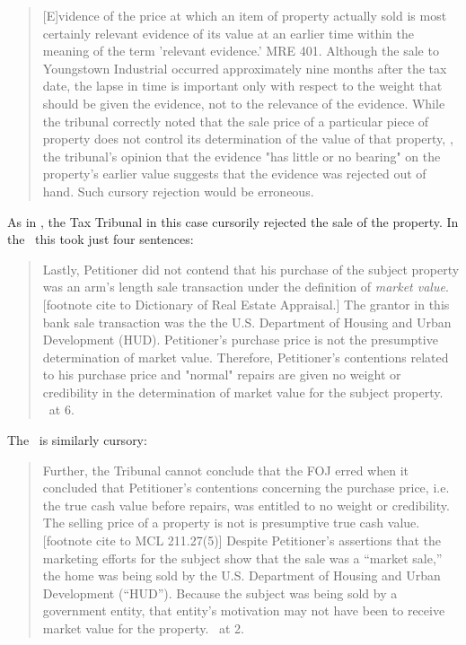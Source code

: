 \documentclass[12pt,\documentclassflag]{michiganCourtOfAppealsBrief}
\begin{document}
\begin{quote}
[E]vidence of the price at which an item of property actually sold is most certainly relevant evidence of its value at an earlier time within the meaning of the term 'relevant evidence.' MRE 401. Although the sale to Youngstown Industrial occurred approximately nine months after the tax date, the lapse in time is important only with respect to the weight that should be given the evidence, not to the relevance of the evidence. While the tribunal correctly noted that the sale price of a particular piece of property does not control its determination of the value of that property, , the tribunal's opinion that the evidence "has little or no bearing" on the property's earlier value suggests that the evidence was rejected out of hand. Such cursory rejection would be erroneous. 
\end{quote} 

As in \cite{Jones & Laughlin}, the Tax Tribunal in this case cursorily rejected the sale of the property. In the \FOJ\ this took just four sentences: 

\begin{quote}
	Lastly, Petitioner did not contend that his purchase of the subject property was an arm's length sale transaction under the definition of \textit{market value}. [footnote cite to Dictionary of Real Estate Appraisal.] The grantor in this bank sale transaction was the the U.S. Department of Housing and Urban Development (HUD). Petitioner's purchase price is not the presumptive determination of market value. Therefore, Petitioner's contentions related to his purchase price and "normal" repairs are given no weight or credibility in the determination of market value for the subject property. \FOJ\ at 6.
\end{quote}

The \orderDenying\ is similarly cursory:

\begin{quote}
	Further, the Tribunal cannot conclude that the FOJ erred when it	concluded that Petitioner’s contentions concerning the purchase price, i.e. the true cash value before repairs, was entitled to no weight or credibility. The selling price of a property is not is presumptive true cash value. [footnote cite to MCL 211.27(5)] Despite Petitioner’s assertions that the marketing efforts for the subject show that the sale was a “market sale,” the home was being sold by the U.S. Department of Housing and Urban Development (“HUD”). Because the subject was being sold by a government entity, that entity’s motivation may not have been to receive market value for the property. \orderDenying\ at 2.
\end{quote}
\end{document}
